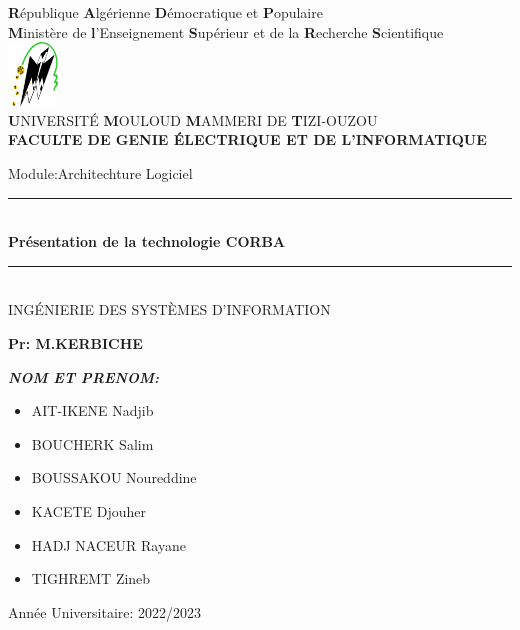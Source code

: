 \thispagestyle{empty}

\begin{center} 

\large \textbf{R}épublique \textbf{A}lgérienne \textbf{D}émocratique et \textbf{P}opulaire\\
\textbf{M}inistère de\textbf{ l}’Enseignement \textbf{S}upérieur et de la\textbf{ R}echerche \textbf{S}cientifique\\
\includegraphics[width=0.1\textwidth]{pdg/ummto.png}\\
\textbf{U}NIVERSITÉ \textbf{M}OULOUD \textbf{M}AMMERI DE \textbf{T}IZI-OUZOU\\
\textbf{ FACULTE DE GENIE ÉLECTRIQUE ET DE L’INFORMATIQUE}\\\vfill


\end{center}


\begin{center}
    \huge Module:Architechture Logiciel\normalsize\\
 
    \rule{0.90\textwidth}{2pt}\\
    \LARGE \textbf
    {Présentation de la technologie \textbf{CORBA}}\\
    \normalsize
    \rule{0.90\textwidth}{2pt}\\
    \large INGÉNIERIE DES SYSTÈMES D'INFORMATION \\
    \vfill
    \begin{flushright}
     \large \textbf {Pr: M.KERBICHE} \\
    \end{flushright}
  \vfill
\begin{flushleft}   
 \large\emph{\textbf{NOM ET PRENOM:}}
 \begin{itemize}[label=$\bullet$]
      \item AIT-IKENE Nadjib
      \item BOUCHERK Salim
      \item BOUSSAKOU Noureddine
      \item KACETE Djouher
      \item HADJ NACEUR Rayane
      \item TIGHREMT Zineb
 \end{itemize}
\end{flushleft}
\vfill

\begin{flushright}
\large Année Universitaire: 2022/2023\\
\end{flushright}
   
\end{center}
    
%